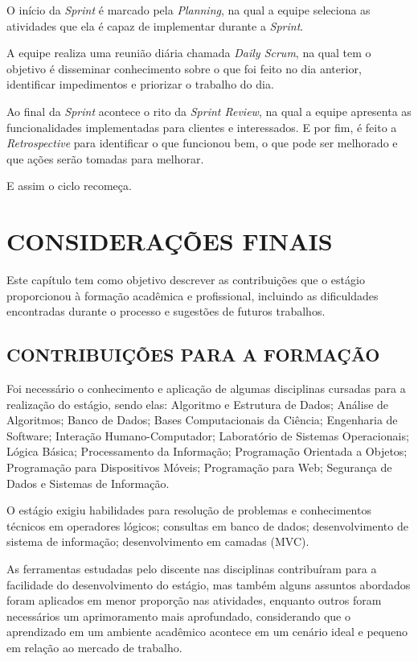 \documentclass[
  12pt,            %
  openany,
  oneside,
  a4paper,         %
  english,      %
  brazil
]{article}
\numberwithin{figure}{section}
\numberwithin{table}{section}
\begin{document}
O início da \textit{Sprint} é marcado pela \textit{Planning}, na qual a equipe seleciona as atividades que ela é capaz de implementar durante a \textit{Sprint}.

A equipe realiza uma reunião diária chamada \textit{Daily Scrum}, na qual tem o objetivo é disseminar conhecimento sobre o que foi feito no dia anterior, identificar impedimentos e priorizar o trabalho do dia.

Ao final da \textit{Sprint} acontece o rito da \textit{Sprint Review}, na qual a equipe apresenta as funcionalidades implementadas para clientes e interessados. E por fim, é feito a \textit{Retrospective} para identificar o que funcionou bem, o que pode ser melhorado e que ações serão tomadas para melhorar.

E assim o ciclo recomeça.



\clearpage
\section{CONSIDERAÇÕES FINAIS}

Este capítulo tem como objetivo descrever as contribuições que o estágio proporcionou à formação acadêmica e profissional, incluindo as dificuldades encontradas durante o processo e sugestões de futuros trabalhos.


\subsection{CONTRIBUIÇÕES PARA A FORMAÇÃO}

Foi necessário o conhecimento e aplicação de algumas disciplinas cursadas para a realização do estágio, sendo elas: Algoritmo e Estrutura de Dados; Análise de Algoritmos; Banco de Dados; Bases Computacionais da Ciência; Engenharia de Software; Interação Humano-Computador; Laboratório de Sistemas Operacionais; Lógica Básica; Processamento da Informação; Programação Orientada a Objetos; Programação para Dispositivos Móveis; Programação para Web; Segurança de Dados e Sistemas de Informação.

O estágio exigiu habilidades para resolução de problemas e conhecimentos técnicos em operadores lógicos; consultas em banco de dados; desenvolvimento de sistema de informação; desenvolvimento em camadas (MVC).

As ferramentas estudadas pelo discente nas disciplinas contribuíram para a facilidade do desenvolvimento do estágio, mas também alguns assuntos abordados foram aplicados em menor proporção nas atividades, enquanto outros foram necessários um aprimoramento mais aprofundado, considerando que o aprendizado em um ambiente acadêmico acontece em um cenário ideal e pequeno em relação ao mercado de trabalho.
\end{document}
